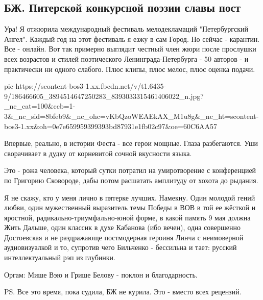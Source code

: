  
 
 
 
 
\subsection{БЖ. Питерской конкурсной поэзии славы пост}
\label{sec:16_05_2021.fb.bilchenko_evgenia.1.poezia_piter_konkurs}

Ура! Я отжюрила международный фестиваль мелодекламаций "Петербургский Ангел".
Каждый год на этот фестиваль я езжу в сам Город. Но сейчас - карантин. Все -
онлайн. Вот так примерно выглядит честный член жюри после прослушки всех
возрастов и стилей поэтического Ленинграда-Петербурга - 50 авторов - и
практически ни одного слабого. Плюс клипы, плюс мелос, плюс оценка подачи. 

\ifcmt
  pic https://scontent-bos3-1.xx.fbcdn.net/v/t1.6435-9/186466605_3894514647250283_8393033315461406022_n.jpg?_nc_cat=100&ccb=1-3&_nc_sid=8bfeb9&_nc_ohc=vKbQzoWEAEkAX_M1u8g&_nc_ht=scontent-bos3-1.xx&oh=0e7e659959399393bd87931e1fb02c97&oe=60C6AA57
\fi

Впервые, реально, в истории Феста - все герои мощные. Глаза разбегаются. Уши
сворачивает в дудку от корневитой сочной вкусности языка.

Это - рожа человека, который сутки потратил на умиротворение с конференцией по
Григорию Сковороде, дабы потом расшатать амплитуду от хохота до рыдания. 

Я не скажу, кто у меня лично в пятерке лучших. Намекну. Один молодой гений
любви, один мужественный выразитель темы Победы в ВОВ в той ее жёсткой и
яростной, радикально-триумфально-юной форме, в какой память 9 мая должна Жить
Дальше, один классик в духе Кабанова (ибо вечен), одна совершенно Достоевская и
не раздражающе постмодерная героиня Линча с неимоверной аудиовизуалкой и то,
супротив чего Бильченко - бессильна и тает: русский интеллектуальный рэп из
глубинки.

Оргам: Мише Вэю и Грише Белову - поклон и благодарность.

PS. Все это время, пока судила, БЖ не курила. Это - вместо всех рецензий.
